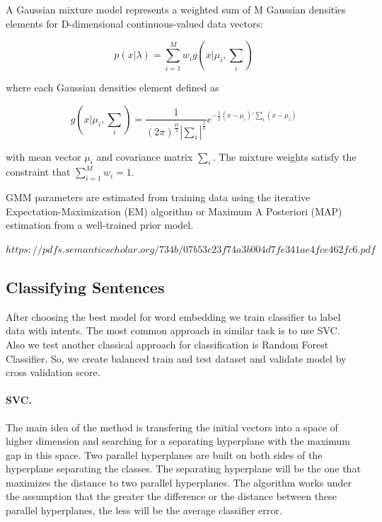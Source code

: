 \documentclass[11pt]{article}
\begin{document}
A Gaussian mixture model represents a weighted sum of M Gaussian densities elements for D-dimensional continuous-valued data vectors:

\begin{equation}
p(x|\lambda) = \sum_{i=1}^{M} w_{i} g(x|\mu_{i}, \sum_{i})
\end{equation}

where each Gaussian densities element defined as 

\begin{equation}
g(x|\mu_{i}, \sum_{i})=\frac{1}{(2\pi)^{\frac{D}{2}}|\sum_{i}|^{\frac{1}{2}}} e^{-\frac{1}{2}(x-\mu_{i})'\sum_{i}(x-\mu_{i})} 
\end{equation}

with mean vector $\mu_{i}$ and covariance matrix $\sum_{i}$. The mixture weights satisfy the constraint that $\sum_{i=1}^{M} w_{i} = 1$.

GMM parameters are estimated from training data using the iterative Expectation-Maximization (EM) algorithm or Maximum A Posteriori (MAP) estimation from a well-trained prior model.

$https://pdfs.semanticscholar.org/734b/07b53c23f74a3b004d7fe341ae4fce462fc6.pdf$

\subsection{Classifying Sentences}

After choosing the best model for word embedding we train classifier to 
label data with intents. The most common approach in similar task is to use
SVC. Also we test another classical approach for classification is Random Forest Classifier. 
So, we create balanced train and test dataset and validate model by 
cross validation score.

\paragraph{SVC.} The main idea of ​​the method is transfering the initial vectors into a space of higher dimension and searching for a separating hyperplane with the maximum gap in this space. Two parallel hyperplanes are built on both sides of the hyperplane separating the classes. The separating hyperplane will be the one that maximizes the distance to two parallel hyperplanes. The algorithm works under the assumption that the greater the difference or the distance between these parallel hyperplanes, the less will be the average classifier error.
\end{document}
